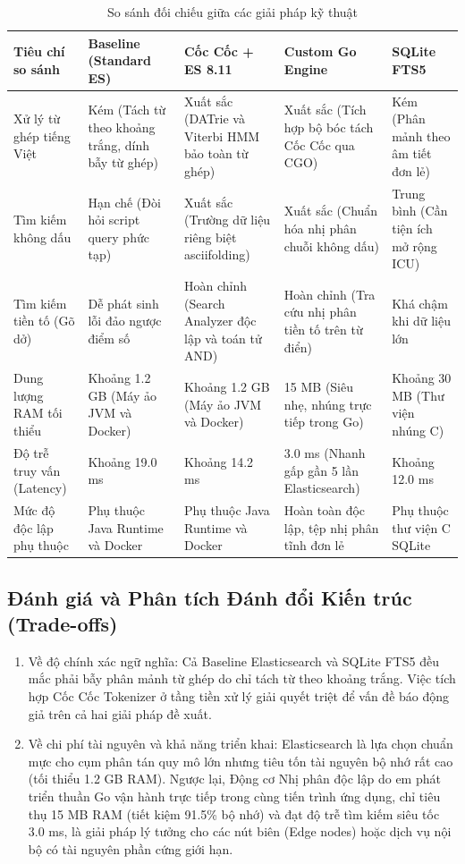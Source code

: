 \documentclass[12pt,a4paper,oneside]{report}
\begin{document}
\begin{table}[H]
\centering
\small
\begin{tabularx}{\textwidth}{p{2.6cm} X X X X}
\toprule
\textbf{Tiêu chí so sánh} & \textbf{Baseline (Standard ES)} & \textbf{Cốc Cốc + ES 8.11} & \textbf{Custom Go Engine} & \textbf{SQLite FTS5} \\
\midrule
Xử lý từ ghép tiếng Việt & Kém (Tách từ theo khoảng trắng, dính bẫy từ ghép) & Xuất sắc (DATrie và Viterbi HMM bảo toàn từ ghép) & Xuất sắc (Tích hợp bộ bóc tách Cốc Cốc qua CGO) & Kém (Phân mảnh theo âm tiết đơn lẻ) \\
Tìm kiếm không dấu & Hạn chế (Đòi hỏi script query phức tạp) & Xuất sắc (Trường dữ liệu riêng biệt asciifolding) & Xuất sắc (Chuẩn hóa nhị phân chuỗi không dấu) & Trung bình (Cần tiện ích mở rộng ICU) \\
Tìm kiếm tiền tố (Gõ dở) & Dễ phát sinh lỗi đảo ngược điểm số & Hoàn chỉnh (Search Analyzer độc lập và toán tử AND) & Hoàn chỉnh (Tra cứu nhị phân tiền tố trên từ điển) & Khá chậm khi dữ liệu lớn \\
Dung lượng RAM tối thiểu & Khoảng 1.2 GB (Máy ảo JVM và Docker) & Khoảng 1.2 GB (Máy ảo JVM và Docker) & 15 MB (Siêu nhẹ, nhúng trực tiếp trong Go) & Khoảng 30 MB (Thư viện nhúng C) \\
Độ trễ truy vấn (Latency) & Khoảng 19.0 ms & Khoảng 14.2 ms & 3.0 ms (Nhanh gấp gần 5 lần Elasticsearch) & Khoảng 12.0 ms \\
Mức độ độc lập phụ thuộc & Phụ thuộc Java Runtime và Docker & Phụ thuộc Java Runtime và Docker & Hoàn toàn độc lập, tệp nhị phân tĩnh đơn lẻ & Phụ thuộc thư viện C SQLite \\
\bottomrule
\end{tabularx}
\caption[So sánh đối chiếu giữa các giải pháp kỹ thuật]{So sánh đối chiếu giữa các giải pháp kỹ thuật}
\label{tab:bang_3_1}
\end{table}

\subsection{Đánh giá và Phân tích Đánh đổi Kiến trúc (Trade-offs)}
\begin{enumerate}
    \item Về độ chính xác ngữ nghĩa: Cả Baseline Elasticsearch và SQLite FTS5 đều mắc phải bẫy phân mảnh từ ghép do chỉ tách từ theo khoảng trắng. Việc tích hợp Cốc Cốc Tokenizer ở tầng tiền xử lý giải quyết triệt để vấn đề báo động giả trên cả hai giải pháp đề xuất.
    \item Về chi phí tài nguyên và khả năng triển khai: Elasticsearch là lựa chọn chuẩn mực cho cụm phân tán quy mô lớn nhưng tiêu tốn tài nguyên bộ nhớ rất cao (tối thiểu 1.2 GB RAM). Ngược lại, Động cơ Nhị phân độc lập do em phát triển thuần Go vận hành trực tiếp trong cùng tiến trình ứng dụng, chỉ tiêu thụ 15 MB RAM (tiết kiệm 91.5\% bộ nhớ) và đạt độ trễ tìm kiếm siêu tốc 3.0 ms, là giải pháp lý tưởng cho các nút biên (Edge nodes) hoặc dịch vụ nội bộ có tài nguyên phần cứng giới hạn.
\end{enumerate}
\end{document}
